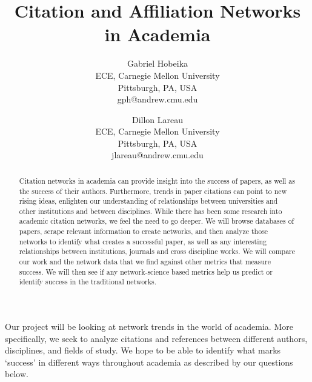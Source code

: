 \documentclass[times, 10pt,twocolumn]{article}
\begin{document}
\title{Citation and Affiliation Networks in Academia }

\author{Gabriel Hobeika\\
ECE, Carnegie Mellon University\\ Pittsburgh, PA, USA\\
gph@andrew.cmu.edu\\
\and
Dillon Lareau\\
ECE, Carnegie Mellon University\\ Pittsburgh, PA, USA\\
jlareau@andrew.cmu.edu\\
}

\maketitle
\thispagestyle{empty}

\begin{abstract}
Citation networks in academia can provide insight into the success of papers, as well as the success of their authors. Furthermore, trends in paper citations can point to new rising ideas, enlighten our understanding of relationships between universities and other institutions and between disciplines. While there has been some research into academic citation networks, we feel the need to go deeper. We will browse databases of papers, scrape relevant information to create networks, and then analyze those networks to identify what creates a successful paper, as well as any interesting relationships between institutions, journals and cross discipline works. We will compare our work and the network data that we find against other metrics that measure success. We will then see if any network-science based metrics help us predict or identify success in the traditional networks. 
\end{abstract}


Our project will be looking at network trends in the world of academia. More specifically, we seek to analyze citations and references between different authors, disciplines, and fields of study. We hope to be able to identify what marks ‘success’ in different ways throughout academia as described by our questions below.
\end{document}
